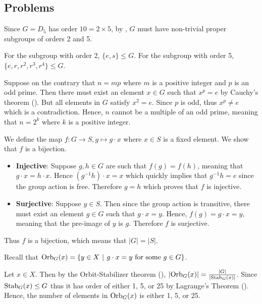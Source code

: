 \subsection*{Problems}
\begin{questions}
    \item \begin{partquestions}{\roman*}
        \item Since $G = D_5$ has order $10 = 2 \times 5$, by , $G$ must have non-trivial proper subgroups of orders 2 and 5.
        \item For the subgroup with order 2, $\{e, s\} \leq G$. For the subgroup with order 5, $\{e, r, r^2, r^3, r^4\} \leq G$.
    \end{partquestions}

    \item Suppose on the contrary that $n = mp$ where $m$ is a positive integer and $p$ is an odd prime. Then there must exist an element $x \in G$ such that $x^p = e$ by Cauchy's theorem (). But all elements in $G$ satisfy $x^2 = e$. Since $p$ is odd, thus $x^p \neq e$ which is a contradiction. Hence, $n$ cannot be a multiple of an odd prime, meaning that $n = 2^k$ where $k$ is a positive integer.

    \item We define the map $f: G \to S, g \mapsto g \cdot x$ where $x \in S$ is a fixed element. We show that $f$ is a bijection.
    \begin{itemize}
        \item \textbf{Injective}: Suppose $g, h \in G$ are such that $f(g) = f(h)$, meaning that $g\cdot x = h\cdot x$. Hence $(g^{-1}h) \cdot x = x$ which quickly implies that $g^{-1}h = e$ since the group action is free. Therefore $g = h$ which proves that $f$ is injective.
        \item \textbf{Surjective}: Suppose $y \in S$. Then since the group action is transitive, there must exist an element $g \in G$ such that $g \cdot x = y$. Hence, $f(g) = g\cdot x = y$, meaning that the pre-image of $y$ is $g$. Therefore $f$ is surjective.
    \end{itemize}
    Thus $f$ is a bijection, which means that $|G| = |S|$.

    \item Recall that $\Orb{G}{x} = \{y \in X \vert g\cdot x = y \text{ for some } g \in G\}$.

    Let $x \in X$. Then by the Orbit-Stabilizer theorem (), $|\mathrm{Orb}_{G}(x)| = \frac{|G|}{|\mathrm{Stab}_{G}(x)|}$. Since $\mathrm{Stab}_{G}(x) \leq G$ thus it has order of either 1, 5, or 25 by Lagrange's Theorem (). Hence, the number of elements in $\mathrm{Orb}_{G}(x)$ is either 1, 5, or 25.


\end{questions}
